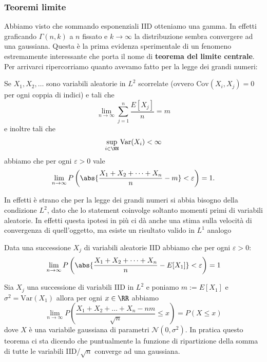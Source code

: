 \documentclass[11pt]{scrartcl}
\begin{document}
	\subsubsection{Teoremi limite}
	Abbiamo visto che sommando esponenziali IID otteniamo una gamma. In effetti graficando $\Gamma(n,k)$ a $n$ fissato e $k\to \infty$ la distribuzione sembra convergere ad una gaussiana. Questa è la prima evidenza sperimentale di un fenomeno estremamente interessante che porta il nome di \textbf{teorema del limite centrale}. Per arrivarci ripercorriamo quanto avevamo fatto per la legge dei grandi numeri:
	\begin{theorem}
		Se $X_1,X_2,\dots$ sono variabili aleatorie in $L^2$ scorrelate (ovvero $\text{Cov}(X_i,X_j)=0$ per ogni coppia di indici) e tali che 
		$$\lim_{n\to\infty}\sum_{j=1}^{n}\frac{E\left[X_j\right]}{n}=m$$
		e inoltre tali che
		$$\sup_{i\in\NN} \text{Var}(X_i)<\infty$$
		abbiamo che per ogni $\varepsilon>0$ vale
		$$\lim_{n\to\infty}P\left(\abs{\frac{X_1+X_2+\dots+X_n}{n}-m}<\varepsilon\right)=1.$$
	\end{theorem}
	In effetti è strano che per la legge dei grandi numeri si abbia bisogno della condizione $L^2$, dato che lo statement coinvolge soltanto momenti primi di variabili aleatorie. In effetti questa ipotesi in più ci dà anche una stima sulla velocità di convergenza di quell'oggetto, ma esiste un risultato valido in $L^1$ analogo 
	\begin{theorem}[LGN in $L^1$]
		Data una successione $X_j$ di variabili aleatorie IID abbiamo che per ogni $\varepsilon>0$:
		$$\lim_{n\to\infty}P\left(\abs{\frac{X_1+X_2+\dots+X_n}{n}-E[X_1]}<\varepsilon\right)=1$$
	\end{theorem}
	\begin{theorem}
		Sia $X_j$ una successione di variabili IID in $L^2$ e poniamo $m:=E[X_1]$ e $\sigma^2=\text{Var}(X_1)$ allora per ogni $x\in\RR$ abbiamo
		$$\lim_{n\to\infty}P\left(\frac{X_1+X_2+\dots+X_n-nm}{\sqrt{n}}\le x\right)=P\left(X\le x\right)$$
		dove $X$ è una variabile gaussiana di parametri $\mathcal{N}(0,\sigma^2)$. In pratica questo teorema ci sta dicendo che puntualmente la funzione di ripartizione della somma di tutte le variabili IID/$\sqrt{n}$ converge ad una gaussiana.
	\end{theorem}
\end{document}
